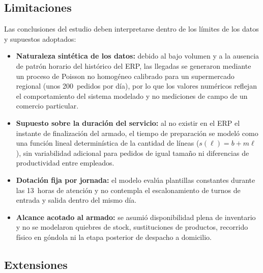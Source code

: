 \subsection{Limitaciones}
\label{sec:limitaciones}

Las conclusiones del estudio deben interpretarse dentro de los límites de los datos y supuestos adoptados:
\begin{itemize}
  \item \textbf{Naturaleza sintética de los datos:} debido al bajo volumen y a la ausencia de patrón horario del histórico del ERP, las llegadas se generaron mediante un proceso de Poisson no homogéneo calibrado para un supermercado regional (unos 200~pedidos por día), por lo que los valores numéricos reflejan el comportamiento del sistema modelado y no mediciones de campo de un comercio particular.
  \item \textbf{Supuesto sobre la duración del servicio:} al no existir en el ERP el instante de finalización del armado, el tiempo de preparación se modeló como una función lineal determinística de la cantidad de líneas ($s(\ell) = b + m\ell$), sin variabilidad adicional para pedidos de igual tamaño ni diferencias de productividad entre empleados.
  \item \textbf{Dotación fija por jornada:} el modelo evalúa plantillas constantes durante las 13~horas de atención y no contempla el escalonamiento de turnos de entrada y salida dentro del mismo día.
  \item \textbf{Alcance acotado al armado:} se asumió disponibilidad plena de inventario y no se modelaron quiebres de stock, sustituciones de productos, recorrido físico en góndola ni la etapa posterior de despacho a domicilio.
\end{itemize}

\subsection{Extensiones}
\label{sec:extensiones}


